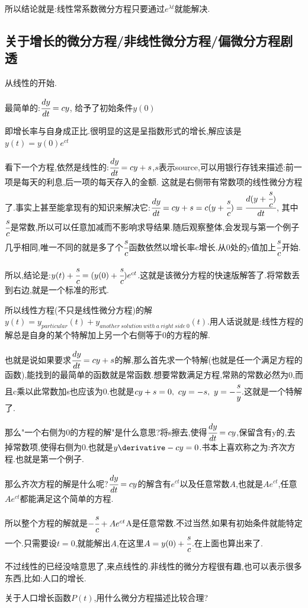 {{{所以结论就是:线性常系数微分方程只要通过$e^{\lambda t}$就能解决.
}%

\subsection{关于增长的微分方程/非线性微分方程/偏微分方程剧透}{
  从线性的开始.

  最简单的:$\cfrac{dy}{dt} = cy$, 给予了初始条件$y(0)$

  即增长率与自身成正比.很明显的这是呈指数形式的增长,解应该是$y(t) = y(0)e^{ct}$

  看下一个方程,依然是线性的:$\cfrac{dy}{dt} = cy + s$,$s$表示source,可以用银行存钱来描述:前一项是每天的利息,后一项的每天存入的金额.
  这就是右侧带有常数项的线性微分方程了.事实上甚至能拿现有的知识来解决它:$\cfrac{dy}{dt} = cy + s = c(y + \cfrac{s}{c}) = \cfrac{d(y + \cfrac{s}{c})}{dt}$, 其中$\cfrac{s}{c}$是常数,所以可以任意加减而不影响求导结果.随后观察整体,会发现与第一个例子几乎相同,唯一不同的就是多了个$\cfrac{s}{c}$函数依然以增长率c增长.从0处的y值加上$\cfrac{s}{c}$开始.

  所以,结论是:$y(t) + \cfrac{s}{c} = (y(0) + \cfrac{s}{c})e^{ct}$.这就是该微分方程的快速版解答了.将常数丢到右边,就是一个标准的形式.

  所以线性方程(不只是线性微分方程)的解$y(t) = y_{particular}(t) + y_{another\ solution\ with\ a\ right\ side\ 0}(t)$.用人话说就是:线性方程的解总是自身的某个特解加上另一个右侧等于0的方程的解.

  也就是说如果要求$\cfrac{dy}{dt} = cy + s$的解,那么首先求一个特解(也就是任一个满足方程的函数),能找到的最简单的函数就是常函数.想要常数满足方程,常熟的常数必然为0,而且c乘以此常数加s也应该为0.也就是$cy + s = 0,\ cy = -s, \ y = -\cfrac{s}{y}$.这就是一个特解了.

  那么"一个右侧为0的方程的解"是什么意思?将s擦去,使得$\cfrac{dy}{dt} = cy$,保留含有y的,去掉常数项,使得右侧为0.也就是$y\derivative - cy = 0$.书本上喜欢称之为:齐次方程.也就是第一个例子.

  那么齐次方程的解是什么呢?$\cfrac{dy}{dt} = cy$的解含有$e^{ct}$以及任意常数$A$,也就是$Ae^{ct}$,任意$Ae^{ct}$都能满足这个简单的方程.

  所以整个方程的解就是$-\cfrac{s}{c} + Ae^{ct}$A是任意常数.不过当然,如果有初始条件就能特定一个.只需要设$t = 0$,就能解出$A$,在这里$A = y(0) + \cfrac{s}{c}$.在上面也算出来了.

  不过线性的已经没啥意思了,来点线性的.非线性的微分方程很有趣,也可以表示很多东西,比如:人口的增长.

  关于人口增长函数$P(t)$,用什么微分方程描述比较合理?

}}}
